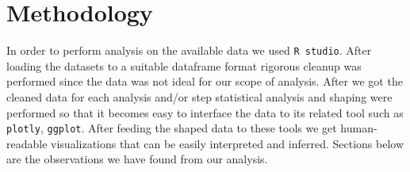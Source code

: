\section{Methodology}
In order to perform analysis on the available data we used \verb|R studio|. After loading the datasets to a suitable dataframe format rigorous cleanup was performed since the data was not ideal for our scope of analysis. After we got the cleaned data for each analysis and/or step statistical analysis and shaping were performed so that it becomes easy to interface the data to its related tool such as \verb|plotly|, \verb|ggplot|. After feeding the shaped data to these tools we get human-readable visualizations that can be easily interpreted and inferred. Sections below are the observations we have found from our analysis.